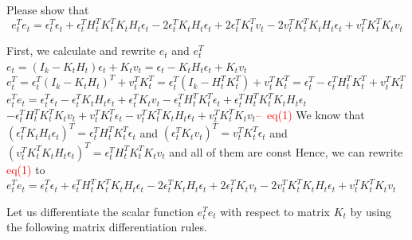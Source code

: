 \documentclass[a4 paper]{article}
\begin{document}
\begin{tcolorbox}[colback=RubineRed!5!white,colframe=RubineRed!75!black]
    Please show that 
    \begin{equation}
        e_t^Te_t=\epsilon_t^T\epsilon_t+\epsilon_t^TH_t^TK_t^TK_tH_t\epsilon_t-2\epsilon_t^TK_tH_t\epsilon_t+2\epsilon_t^TK_t^Tv_t-2v_t^TK_t^TK_tH_t\epsilon_t+v_t^TK_t^TK_tv_t
    \end{equation}
\end{tcolorbox}
\begin{tcolorbox}[colback=YellowGreen!5!white,colframe=YellowGreen!75!black,title={Problem 1's answer}]
    First, we calculate and rewrite $e_t$ and $e_t^T$\newline
    $e_t=(I_k-K_tH_t)\epsilon_t+K_tv_t=\epsilon_t-K_tH_t\epsilon_t+K_tv_t$ \newline
    $e_t^T=\epsilon_t^T(I_k-K_tH_t)^T+v_t^TK_t^T=\epsilon_t^T(I_k-H_t^TK_t^T)+v_t^TK_t^T=\epsilon_t^T-\epsilon_t^TH_t^TK_t^T+v_t^TK_t^T$\newline
    \newline
    $e_t^Te_t=\epsilon_t^T\epsilon_t-\epsilon_t^TK_tH_t\epsilon_t+\epsilon_t^TK_tv_t-\epsilon_t^TH_t^TK_t^T\epsilon_t+\epsilon_t^TH_t^TK_t^TK_tH_t\epsilon_t$\newline
    \hspace*{0.5cm}$-\epsilon_t^TH_t^TK_t^TK_tv_t+v_t^TK_t^T\epsilon_t-v_t^TK_t^TK_tH_t\epsilon_t+v_t^TK_t^TK_tv_t$\hspace*{0.2cm}\textcolor{red}{--\ eq(1)}\newline
    \newline
    We know that $\left(\epsilon_t^TK_tH_t\epsilon_t\right)^T=\epsilon_t^TH_t^TK_t^T\epsilon_t$ and $\left(\epsilon_t^TK_tv_t\right)^T=v_t^TK_t^T\epsilon_t$\newline
    \hspace*{0.5cm}and $\left(v_t^TK_t^TK_tH_t\epsilon_t\right)^T=\epsilon_t^TH_t^TK_t^TK_tv_t$ and all of them are const\newline
    \newline
    Hence, we can rewrite \textcolor{red}{eq(1)} to \newline
    $e_t^Te_t=\epsilon_t^T\epsilon_t+\epsilon_t^TH_t^TK_t^TK_tH_t\epsilon_t-2\epsilon_t^TK_tH_t\epsilon_t+2\epsilon_t^TK_tv_t-2v_t^TK_t^TK_tH_t\epsilon_t+v_t^TK_t^TK_tv_t$
\end{tcolorbox}
Let us differentiate the scalar function $e_t^Te_t$ with respect to matrix $K_t$ by using the following matrix differentiation rules.
\end{document}
